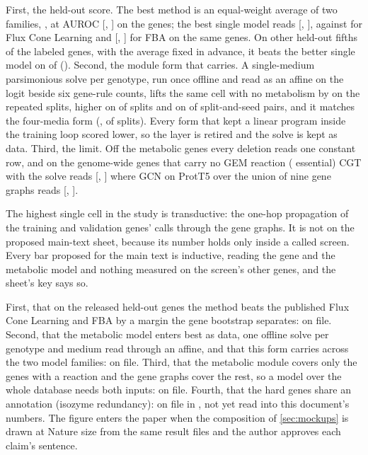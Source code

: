  First, the held-out score. The best method is an
equal-weight average of two families, \gbestAverageNames{}, at \gbestAverage{} AUROC
[\gbestAverageLo{}, \gbestAverageHi{}] on the \gnHeldOut{} genes; the best single model
reads \gbestSingle{} [\gbestSingleLo{}, \gbestSingleHi{}], against \gfclAuroc{} for Flux
Cone Learning and \gfbaAuroc{} [\gfbaAurocLo{}, \gfbaAurocHi{}] for FBA on the same
genes. On \gnResplits{} other held-out fifths of the labeled genes, with the average fixed
in advance, it beats the better single model on
\gresplitDiffaverageMinusthebettersinglemodelUp{} of
\gresplitDiffaverageMinusthebettersinglemodelOf{}
(\gresplitDiffaverageMinusthebettersinglemodel{}). Second, the module form that carries.
A single-medium parsimonious solve per genotype, run once offline and read as an affine
on the logit beside six gene-rule counts, lifts the same cell with no metabolism by
\ggainOneMediumOverNone{} on the \gnResplits{} repeated splits, higher on
\ggainOneMediumOverNoneUp{} of \ggainOneMediumOverNoneOf{} splits and on
\ggainOneMediumOverNonePairsUp{} of \ggainOneMediumOverNonePairs{} split-and-seed pairs,
and it matches the four-media form (\goneMinusFour{}, \goneMinusFourUp{} of
\goneMinusFourOf{} splits). Every form that kept a linear program inside the training
loop scored lower, so the layer is retired and the solve is kept as data. Third, the
limit. Off the metabolic genes every deletion reads one constant row, and on the
\ggenomeN{} genome-wide genes that carry no GEM reaction (\ggenomeEssential{} essential)
CGT with the solve reads \ggenlayerFree{} [\ggenlayerFreeLo{},
\ggenlayerFreeHi{}] where GCN on ProtT5 over the union of nine gene graphs
reads \ggengcnProt{} [\ggengcnProtLo{}, \ggengcnProtHi{}].

 The highest single cell in the
study is transductive: the one-hop propagation of the training and validation genes'
calls through the gene graphs. It is not on the proposed main-text sheet, because its
number holds only inside a called screen. Every bar proposed for the main text is
inductive, reading the gene and the metabolic model and nothing measured on the screen's
other genes, and the sheet's key says so. \regimekey{}

 First, that on the released held-out
genes the method beats the published Flux Cone Learning and FBA by a margin the gene
bootstrap separates: on file. Second, that the metabolic model enters best as data, one
offline solve per genotype and medium read through an affine, and that this form carries
across the two model families: on file. Third, that the metabolic module covers only
the genes with a reaction and the gene graphs cover the rest, so a model over the whole
database needs both inputs: on file. Fourth, that the hard genes share an annotation
(isozyme redundancy): on file in , not yet read into this
document's numbers. The figure enters the paper when the composition of
\ref{sec:mockups} is drawn at Nature size from the same result files and the author
approves each claim's sentence.

